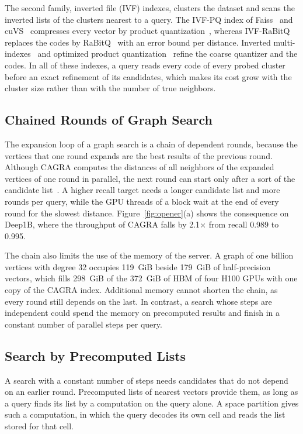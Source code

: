 \documentclass[letterpaper,twocolumn,10pt]{article}
\begin{document}
The second family, inverted file (IVF) indexes, clusters the dataset and scans the inverted lists of the clusters nearest to a query. The IVF-PQ index of Faiss~\cite{johnson2019faiss} and cuVS~\cite{nvidia2025cuvs} compresses every vector by product quantization~\cite{jegou2011pq}, whereas IVF-RaBitQ~\cite{shi2026ivfrabitq} replaces the codes by RaBitQ~\cite{gao2024rabitq} with an error bound per distance. Inverted multi-indexes~\cite{babenko2012imi} and optimized product quantization~\cite{ge2013opq} refine the coarse quantizer and the codes. In all of these indexes, a query reads every code of every probed cluster before an exact refinement of its candidates, which makes its cost grow with the cluster size rather than with the number of true neighbors.

\subsection{Chained Rounds of Graph Search}
\label{sec:chain}

The expansion loop of a graph search is a chain of dependent rounds, because the vertices that one round expands are the best results of the previous round. Although CAGRA computes the distances of all neighbors of the expanded vertices of one round in parallel, the next round can start only after a sort of the candidate list~\cite{ootomo2024cagra}. A higher recall target needs a longer candidate list and more rounds per query, while the GPU threads of a block wait at the end of every round for the slowest distance. Figure~\ref{fig:opener}(a) shows the consequence on Deep1B, where the throughput of CAGRA falls by 2.1$\times$ from recall 0.989 to 0.995.

The chain also limits the use of the memory of the server. A graph of one billion vertices with degree 32 occupies 119~GiB beside 179~GiB of half-precision vectors, which fills 298~GiB of the 372~GiB of HBM of four H100 GPUs with one copy of the CAGRA index. Additional memory cannot shorten the chain, as every round still depends on the last. In contrast, a search whose steps are independent could spend the memory on precomputed results and finish in a constant number of parallel steps per query.

\subsection{Search by Precomputed Lists}

A search with a constant number of steps needs candidates that do not depend on an earlier round. Precomputed lists of nearest vectors provide them, as long as a query finds its list by a computation on the query alone. A space partition gives such a computation, in which the query decodes its own cell and reads the list stored for that cell.
\end{document}
